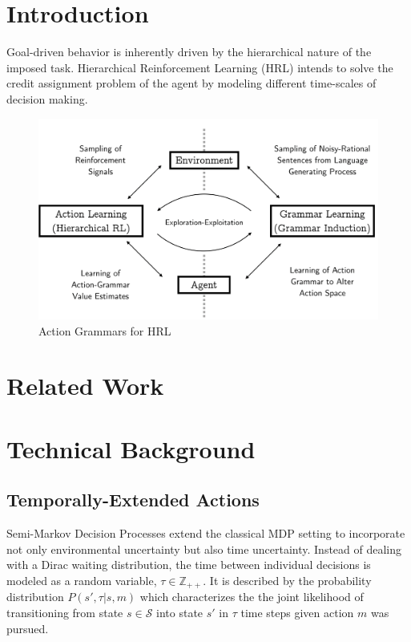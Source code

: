 \documentclass{article}
\begin{document}
\section{Introduction}\label{ch1:intro}
Goal-driven behavior is inherently driven by the hierarchical nature of the imposed task. Hierarchical Reinforcement Learning (HRL) intends to solve the credit assignment problem of the agent by modeling different time-scales of decision making. 

\begin{figure}[H]
    \centering
    \includegraphics[width=\linewidth]{figures/concept_al_gl.png}
    \caption{Action Grammars for HRL}
    \label{fig:loop_ag}
\end{figure}

\newpage
\section{Related Work}

\newpage
\section{Technical Background}

\subsection{Temporally-Extended Actions}

Semi-Markov Decision Processes extend the classical MDP setting to incorporate not only environmental uncertainty but also time uncertainty. Instead of dealing with a Dirac waiting distribution, the time between individual decisions is modeled as a random variable, $\tau \in \mathbb{Z}_{++}$. It is described by the probability distribution $P(s', \tau| s, m)$  which characterizes the the joint likelihood of transitioning from state $s \in \mathcal{S}$ into state $s'$ in $\tau$ time steps given action $m$ was pursued.
\end{document}
